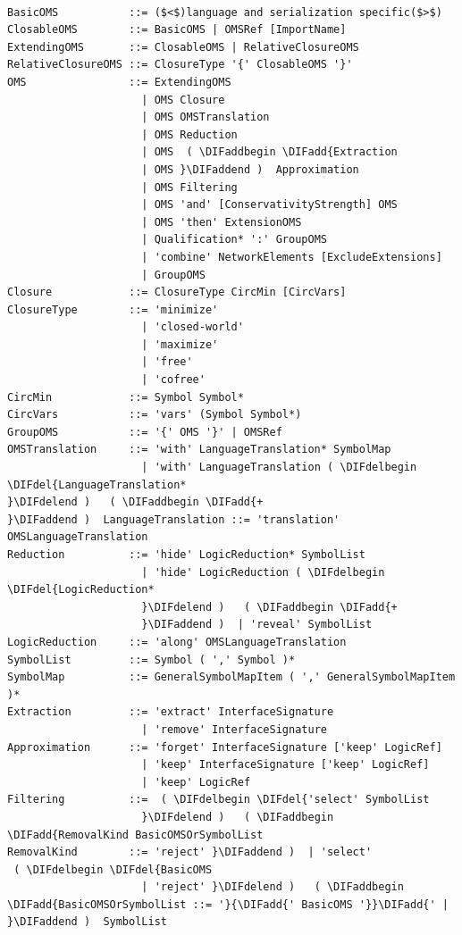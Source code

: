 \documentclass[10pt,fleqn,final]{scrreprt}
\providecommand{\DIFadd}[1]{{\protect\color{blue}\uwave{#1}}} %
\providecommand{\DIFdel}[1]{{\protect\color{red}\sout{#1}}}                      %
\providecommand{\DIFaddbegin}{} %
\providecommand{\DIFaddend}{} %
\providecommand{\DIFdelbegin}{} %
\providecommand{\DIFdelend}{} %
\begin{document}
\begin{lstlisting}[language=ebnf,escapeinside={()},mathescape]

BasicOMS           ::= ($<$)language and serialization specific($>$) 
ClosableOMS        ::= BasicOMS | OMSRef [ImportName]
ExtendingOMS       ::= ClosableOMS | RelativeClosureOMS
RelativeClosureOMS ::= ClosureType '{' ClosableOMS '}'
OMS                ::= ExtendingOMS
                     | OMS Closure
                     | OMS OMSTranslation
                     | OMS Reduction
                     | OMS  ( \DIFaddbegin \DIFadd{Extraction
                     | OMS }\DIFaddend )  Approximation
                     | OMS Filtering
                     | OMS 'and' [ConservativityStrength] OMS
                     | OMS 'then' ExtensionOMS
                     | Qualification* ':' GroupOMS
                     | 'combine' NetworkElements [ExcludeExtensions]
                     | GroupOMS
Closure            ::= ClosureType CircMin [CircVars]
ClosureType        ::= 'minimize'
                     | 'closed-world'
                     | 'maximize'
                     | 'free'
                     | 'cofree'
CircMin            ::= Symbol Symbol*
CircVars           ::= 'vars' (Symbol Symbol*)
GroupOMS           ::= '{' OMS '}' | OMSRef
OMSTranslation     ::= 'with' LanguageTranslation* SymbolMap
                     | 'with' LanguageTranslation ( \DIFdelbegin \DIFdel{LanguageTranslation*
}\DIFdelend )   ( \DIFaddbegin \DIFadd{+
}\DIFaddend )  LanguageTranslation ::= 'translation' OMSLanguageTranslation
Reduction          ::= 'hide' LogicReduction* SymbolList
                     | 'hide' LogicReduction ( \DIFdelbegin \DIFdel{LogicReduction*
                     }\DIFdelend )   ( \DIFaddbegin \DIFadd{+
                     }\DIFaddend )  | 'reveal' SymbolList
LogicReduction     ::= 'along' OMSLanguageTranslation
SymbolList         ::= Symbol ( ',' Symbol )*
SymbolMap          ::= GeneralSymbolMapItem ( ',' GeneralSymbolMapItem )*
Extraction         ::= 'extract' InterfaceSignature
                     | 'remove' InterfaceSignature
Approximation      ::= 'forget' InterfaceSignature ['keep' LogicRef]
                     | 'keep' InterfaceSignature ['keep' LogicRef]
                     | 'keep' LogicRef
Filtering          ::=  ( \DIFdelbegin \DIFdel{'select' SymbolList
                     }\DIFdelend )   ( \DIFaddbegin \DIFadd{RemovalKind BasicOMSOrSymbolList
RemovalKind        ::= 'reject' }\DIFaddend )  | 'select'
 ( \DIFdelbegin \DIFdel{BasicOMS
                     | 'reject' }\DIFdelend )   ( \DIFaddbegin \DIFadd{BasicOMSOrSymbolList ::= '}{\DIFadd{' BasicOMS '}}\DIFadd{' | }\DIFaddend )  SymbolList

\end{lstlisting}
\end{document}

